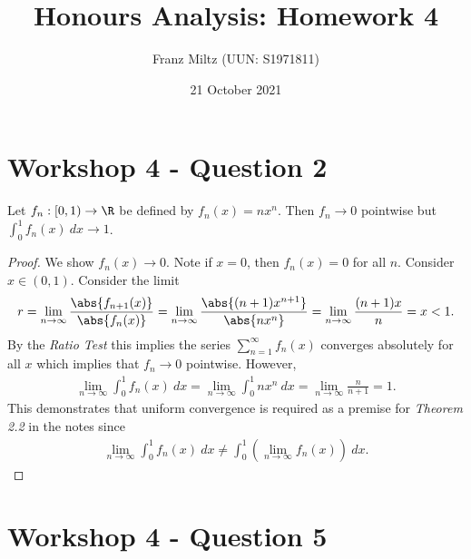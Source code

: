 \documentclass{article}
\begin{document}
\title{Honours Analysis: Homework 4}
\author{Franz Miltz (UUN: S1971811)}
\date{21 October 2021}
\maketitle

\section*{Workshop 4 - Question 2}

\begin{claim*}
   Let $f_n:\left[0,1\right)\to\R$ be defined by $f_n(x)=nx^n$.
   Then $f_n\to 0$ pointwise but $\int_0^1 f_n(x)\:dx\to 1$.
\end{claim*}

\begin{proof}
   We show $f_n(x)\to 0$.
   Note if $x=0$, then $f_n(x)=0$ for all $n$. Consider $x\in(0,1)$.
   Consider the limit
   \begin{align*}
      r = \lim_{n\to\infty} \frac{\abs{f_{n+1}(x)}}{\abs{f_n(x)}}
      = \lim_{n\to\infty}\frac{\abs{(n+1)x^{n+1}}}{\abs{nx^n}}
      = \lim_{n\to\infty}\frac{(n+1)x}{n} = x < 1.
   \end{align*}
   By the \emph{Ratio Test} this implies the series $\sum_{n=1}^\infty
      f_n(x)$ converges absolutely for all $x$ which implies that
   $f_n\to 0$ pointwise. However,
   \begin{align*}
      \lim_{n\to\infty} \int_0^1 f_n(x)\:dx
      = \lim_{n\to\infty}\int_0^1 nx^n\:dx
      = \lim_{n\to\infty}\frac{n}{n+1} = 1.
   \end{align*}
   This demonstrates that uniform convergence is required as a premise for
   \emph{Theorem 2.2} in the notes since
   \begin{align*}
      \lim_{n\to\infty} \int_0^1 f_n(x)\:dx
      \not = \int_0^1\left(\lim_{n\to\infty} f_n(x)\right)\:dx.
   \end{align*}
\end{proof}

\section*{Workshop 4 - Question 5}
\end{document}
